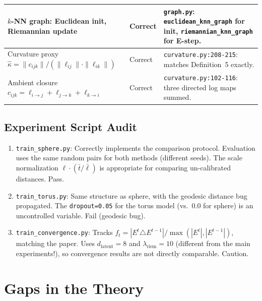 \documentclass{article}
\begin{document}
\begin{table}[h]
\begin{tabular}{p{4.5cm}p{2cm}p{6cm}}
\midrule
$k$-NN graph: Euclidean init, Riemannian update &
  \textcolor{green!60!black}{Correct} &
  \texttt{graph.py}: \texttt{euclidean\_knn\_graph} for init,
  \texttt{riemannian\_knn\_graph} for E-step. \\
\midrule
Curvature proxy $\hat{\kappa} = \|c_{ijk}\| / (\|\ell_{ij}\| \cdot \|\ell_{ik}\|)$ &
  \textcolor{green!60!black}{Correct} &
  \texttt{curvature.py:208-215}: matches Definition~5 exactly. \\
\midrule
Ambient closure $c_{ijk} = \ell_{i\to j} + \ell_{j\to k} + \ell_{k\to i}$ &
  \textcolor{green!60!black}{Correct} &
  \texttt{curvature.py:102-116}: three directed log maps summed. \\
\bottomrule
\end{tabular}
\end{table}

\subsection{Experiment Script Audit}

\begin{enumerate}
  \item \texttt{train\_sphere.py}: Correctly implements the comparison protocol.
    Evaluation uses the same random pairs for both methods (different seeds).
    The scale normalization $\ell \cdot (\bar{t}/\bar{\ell})$ is appropriate
    for comparing un-calibrated distances. \textcolor{green!60!black}{Pass.}

  \item \texttt{train\_torus.py}: Same structure as sphere, with the
    geodesic distance bug propagated. The \texttt{dropout=0.05} for the torus
    model (vs.\ 0.0 for sphere) is an uncontrolled variable.
    \textcolor{red!60!black}{Fail (geodesic bug).}

  \item \texttt{train\_convergence.py}: Tracks $f_t = |E^t \triangle E^{t-1}|
    / \max(|E^t|, |E^{t-1}|)$, matching the paper. Uses $d_{\text{latent}}=8$
    and $\lambda_{\text{riem}}=10$ (different from the main experiments!),
    so convergence results are not directly comparable.
    \textcolor{yellow!70!black}{Caution.}
\end{enumerate}

\section{Gaps in the Theory}
\label{sec:gaps}
\end{document}
